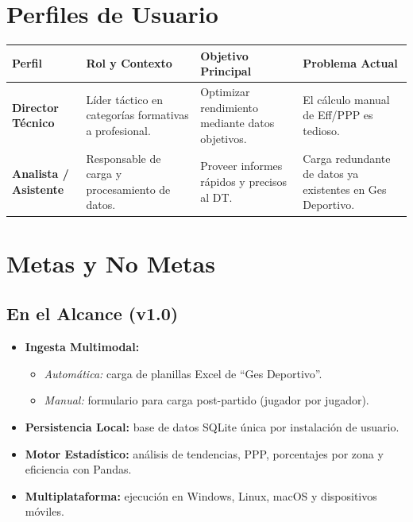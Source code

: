 \documentclass[11pt,a4paper]{article}
\begin{document}
\section{Perfiles de Usuario}

\vspace{4pt}
\begin{tabularx}{\textwidth}{>{\small\bfseries}p{2.8cm} >{\small}X >{\small}X >{\small}p{3.2cm}}
\toprule
\rowcolor{headergray}
\textbf{Perfil} & \textbf{Rol y Contexto} & \textbf{Objetivo Principal} & \textbf{Problema Actual} \\
\midrule
Director Técnico & Líder táctico en categorías formativas a profesional. & Optimizar rendimiento mediante datos objetivos. & El cálculo manual de Eff/PPP es tedioso. \\
\rowcolor{headergray}
Analista / Asistente & Responsable de carga y procesamiento de datos. & Proveer informes rápidos y precisos al DT. & Carga redundante de datos ya existentes en Ges Deportivo. \\
\bottomrule
\end{tabularx}

\section{Metas y No Metas}

\subsection{En el Alcance (v1.0)}
\begin{itemize}[nosep]
  \item \textbf{Ingesta Multimodal:}
    \begin{itemize}[nosep]
      \item \textit{Automática:} carga de planillas Excel de ``Ges Deportivo''.
      \item \textit{Manual:} formulario para carga post-partido (jugador por jugador).
    \end{itemize}
  \item \textbf{Persistencia Local:} base de datos SQLite única por instalación de usuario.
  \item \textbf{Motor Estadístico:} análisis de tendencias, PPP, porcentajes por zona y eficiencia con Pandas.
  \item \textbf{Multiplataforma:} ejecución en Windows, Linux, macOS y dispositivos móviles.
\end{itemize}
\end{document}
